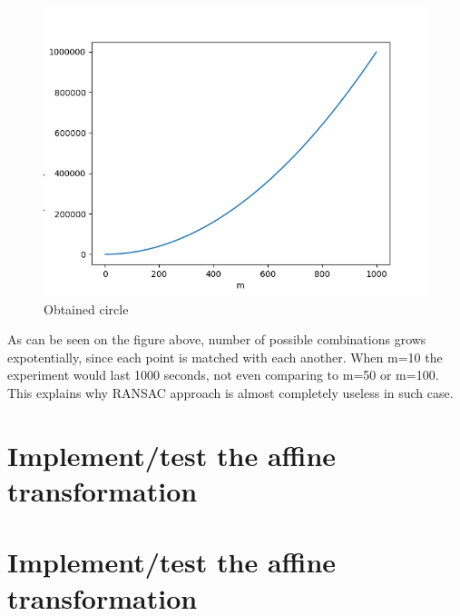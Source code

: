\documentclass[notitlepage,english]{hgbreport}
\begin{document}
\begin{figure}[!htbp]
\caption{Obtained circle}
\includegraphics{assignment02_ramsac}
\end{figure}
As can be seen on the figure above, number of possible combinations grows expotentially, since each point is matched with each another. When m=10 the experiment would last 1000 seconds, not even comparing to m=50 or m=100. This explains why RANSAC approach is almost completely useless in such case. 



\section {Implement/test the affine transformation}



\section {Implement/test the affine transformation}

\MakeBibliography[nosplit]
\end{document}
